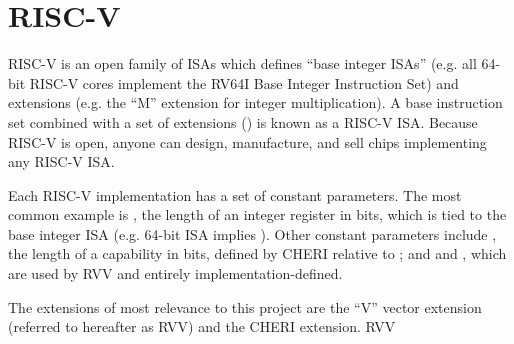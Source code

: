 \section{RISC-V}\label{chap:bg:sec:rvv}
RISC-V is an open family of ISAs which defines ``base integer ISAs'' (e.g. all 64-bit RISC-V cores implement the RV64I Base Integer Instruction Set) and extensions (e.g. the ``M'' extension for integer multiplication).
A base instruction set combined with a set of extensions () is known as a RISC-V ISA.
Because RISC-V is open, anyone can design, manufacture, and sell chips implementing any RISC-V ISA.

Each RISC-V implementation has a set of constant parameters.
The most common example is , the length of an integer register in bits, which is tied to the base integer ISA (e.g. 64-bit ISA implies ).
Other constant parameters include , the length of a capability in bits, defined by CHERI relative to ; and  and , which are used by RVV and entirely implementation-defined.

The extensions of most relevance to this project are the ``V'' vector extension (referred to hereafter as RVV) and the CHERI extension.
RVV 
